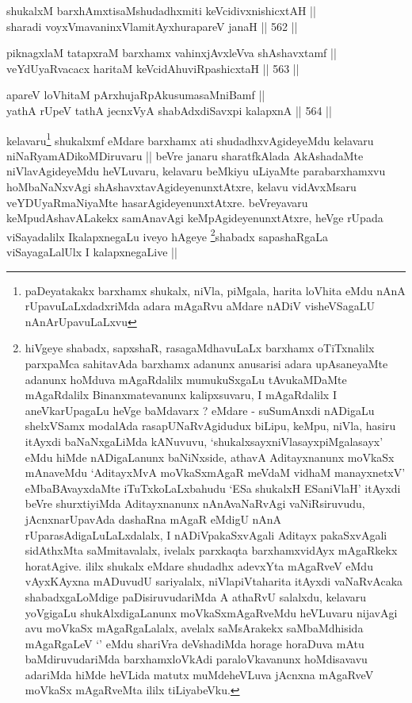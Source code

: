 \begin{shl}
shukalxM barxhAmxtisaMshudadhxmiti keVcidivxnishicxtAH || \\
sharadi voyxVmavaninxVlamitAyxhurapareV janaH ||  562 ||  
\end{shl}
				
\begin{shl}
piknagxlaM tatapxraM barxhamx vahinxjAvxleVva shAshavxtamf || \\
veYdUyaRvacacx haritaM keVcidAhuviRpashicxtaH ||  563 ||  
\end{shl}
				
\begin{shl}
apareV loVhitaM pArxhujaRpAkusumasaMniBamf || \\
yathA rUpeV tathA jecnxVyA shabAdxdiSavxpi kalapxnA ||  564 ||  
\end{shl}

\begin{artha}
kelavaru\footnote{paDeyatakakx barxhamx shukalx, niVla, piMgala,
  harita loVhita eMdu nAnA rUpavuLaLxdadxriMda adara mAgaRvu aMdare
  nADiV visheVSagaLU nAnArUpavuLaLxvu} shukalxmf eMdare barxhamx ati shudadhxvAgideyeMdu
kelavaru niNaRyamADikoMDiruvaru || beVre janaru sharatfkAlada
AkAshadaMte niVlavAgideyeMdu heVLuvaru, kelavaru beMkiyu uLiyaMte
parabarxhamxvu hoMbaNaNxvAgi shAshavxtavAgideyenunxtAtxre, kelavu
vidAvxMsaru veYDUyaRmaNiyaMte hasarAgideyenunxtAtxre. beVreyavaru
keMpudAshavALakekx samAnavAgi keMpAgideyenunxtAtxre, heVge rUpada
viSayadalilx IkalapxnegaLu iveyo hAgeye \footnote{hiVgeye shabadx,
  sapxshaR, rasagaMdhavuLaLx barxhamx oTiTxnalilx parxpaMca sahitavAda
  barxhamx adanunx anusarisi adara upAsaneyaMte adanunx hoMduva
  mAgaRdalilx mumukuSxgaLu tAvukaMDaMte mAgaRdalilx Binanxmatevanunx
  kalipxsuvaru, I mAgaRdalilx I aneVkarUpagaLu heVge baMdavarx ?
  eMdare - suSumAnxdi nADigaLu shelxVSamx modalAda rasapUNaRvAgidudux
  biLipu, keMpu, niVla, hasiru itAyxdi baNaNxgaLiMda kANuvuvu,
  `shukalxsayxniVlasayxpiMgalasayx' eMdu hiMde nADigaLanunx
  baNiNxside, athavA Aditayxnanunx moVkaSx mAnaveMdu `AditayxMvA
  moVkaSxmAgaR meVdaM vidhaM manayxnetxV' eMbaBAvayxdaMte
  iTuTxkoLaLxbahudu `ESa shukalxH ESaniVlaH' itAyxdi beVre
  shurxtiyiMda Aditayxnanunx nAnAvaNaRvAgi vaNiRsiruvudu,
  jAcnxnarUpavAda dashaRna mAgaR eMdigU nAnA rUparasAdigaLuLaLxdalalx,
  I nADiVpakaSxvAgali Aditayx pakaSxvAgali sidAthxMta saMmitavalalx,
  ivelalx parxkaqta barxhamxvidAyx mAgaRkekx horatAgive. ililx shukalx
  eMdare shudadhx adevxYta mAgaRveV eMdu vAyxKAyxna mADuvudU
  sariyalalx, niVlapiVtaharita itAyxdi vaNaRvAcaka shabadxgaLoMdige
  paDisiruvudariMda A athaRvU salalxdu, kelavaru yoVgigaLu
  shukAlxdigaLanunx moVkaSxmAgaRveMdu heVLuvaru nijavAgi avu moVkaSx
  mAgaRgaLalalx, avelalx saMsArakekx saMbaMdhisida mAgaRgaLeV `\stext'
  eMdu shariVra deVshadiMda horage horaDuva mAtu baMdiruvudariMda
  barxhamxloVkAdi paraloVkavanunx hoMdisavavu adariMda hiMde heVLida
  matutx muMdeheVLuva jAcnxna mAgaRveV moVkaSx mAgaRveMta ililx tiLiyabeVku.}shabadx
sapashaRgaLa viSayagaLalUlx I kalapxnegaLive ||
\end{artha}

